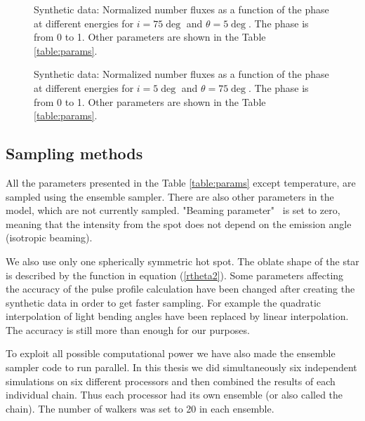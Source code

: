 \documentclass{wihuri}
\begin{document}
%



\begin{figure}
\centerline{}
\caption{Synthetic data: Normalized number fluxes as a function of the phase at different energies for $i = 75 \deg$ and $\theta = 5 \deg$. The phase is from 0 to 1. Other parameters are shown in the Table \ref{table:params}.
\label{fig:syntpol2}}
\end{figure}


\begin{figure}
\centerline{}
\caption{Synthetic data: Normalized number fluxes as a function of the phase at different energies for $i = 5 \deg$ and $\theta = 75 \deg$. The phase is from 0 to 1. Other parameters are shown in the Table \ref{table:params}.
\label{fig:synteq2}}
\end{figure}


\subsection{Sampling methods}

All the parameters presented in the Table \ref{table:params} except temperature, are sampled using the ensemble sampler. There are also other parameters in the model, which are not currently sampled. %
"Beaming parameter" \ is set to zero, meaning that the intensity from the spot does not depend on the emission angle (isotropic beaming). 

We also use only one spherically symmetric hot spot. The oblate shape of the star is described by the function in equation (\ref{rtheta2}). Some parameters affecting the accuracy of the pulse profile calculation have been changed after creating the synthetic data in order to get faster sampling. For example the quadratic interpolation of light bending angles have been replaced by linear interpolation. The accuracy is still more than enough for our purposes. 

To exploit all possible computational power we have also made the ensemble sampler code to run parallel. In this thesis we did simultaneously six independent simulations on six different processors and then combined the results of each individual chain. Thus each processor had its own ensemble (or also called the chain). The number of walkers was set to 20 in each ensemble. 
 
\end{document}
